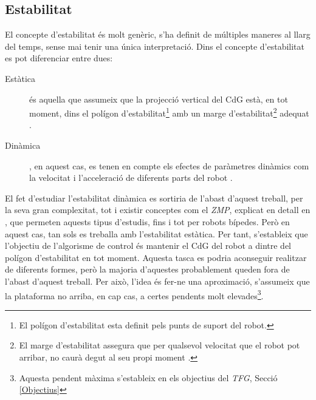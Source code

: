 \documentclass[12pt,a4paper,final,twoside]{article}
\begin{document}


\subsection{Estabilitat}
\label{Estabilitat}

El concepte d'estabilitat és molt genèric, s'ha definit de múltiples maneres al llarg del temps, sense mai tenir una única interpretació. Dins el concepte d'estabilitat es pot diferenciar entre dues:
\begin{description}

\item[Estàtica] és aquella que assumeix que la projecció vertical del CdG està, en tot moment, dins el polígon d'estabilitat\footnote{El polígon d'estabilitat esta definit pels punts de suport del robot.} amb un marge d'estabilitat\footnote{El marge d'estabilitat assegura que per qualsevol velocitat que el robot pot arribar, no caurà degut al seu propi moment \cite{Hugel1999}.} adequat \cite{Hugel1999}.

\item[Dinàmica], en aquest cas, es tenen en compte els efectes de paràmetres dinàmics com la velocitat i l'acceleració de diferents parts del robot \cite{Yazdani2012}.

\end{description}

El fet d'estudiar l'estabilitat dinàmica es sortiria de l'abast d'aquest treball, per la seva gran complexitat, tot i existir conceptes com el \textit{ZMP}, explicat en detall en \cite{Vukobratovic2004}, que permeten aquests tipus d'estudis, fins i tot per robots bípedes. Però en aquest cas, tan sols es treballa amb l'estabilitat estàtica. Per tant, s'estableix que l'objectiu de l'algorisme de control és mantenir el CdG del robot a dintre del polígon d'estabilitat en tot moment. Aquesta tasca es podria aconseguir realitzar de diferents formes, però la majoria d'aquestes probablement queden fora de l'abast d'aquest treball. Per això, l'idea és fer-ne una aproximació, s'assumeix que la plataforma no arriba, en cap cas, a certes pendents molt elevades\footnote{Aquesta pendent màxima s'estableix en els objectius del \textit{TFG}, Secció \ref{Objectius}}.
\end{document}

